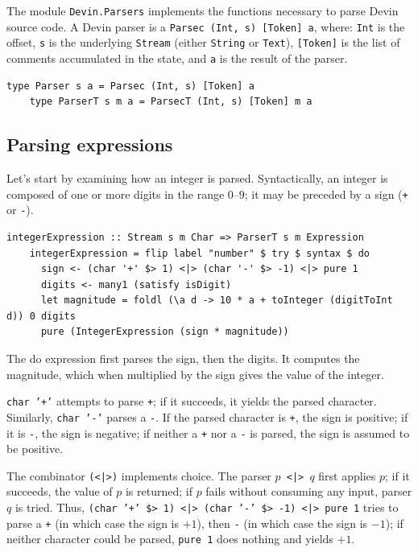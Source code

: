 \documentclass[UdineBachThesis,american,11pt]{PhdThesis}
\begin{document}
  \pagebreak

  The module \mbox{\texttt{Devin.Parsers}} implements the functions necessary to
  parse Devin source code. A Devin parser is a
  \mbox{\texttt{Parsec (Int, s) [Token] a}}, where: \mbox{\texttt{Int}} is the
  offset, \texttt{s} is the underlying \mbox{\texttt{Stream}} (either
  \mbox{\texttt{String}} or \mbox{\texttt{Text}}), \mbox{\texttt{[Token]}} is
  the list of comments accumulated in the state, and \texttt{a} is the result of
  the parser.

  \begin{Verbatim}[gobble=4,fontsize=\small]
    type Parser s a = Parsec (Int, s) [Token] a
    type ParserT s m a = ParsecT (Int, s) [Token] m a
  \end{Verbatim}

  \subsection{Parsing expressions}

  Let's start by examining how an integer is parsed. Syntactically, an integer
  is composed of one or more digits in the range \mbox{$0$--$9$}; it may be
  preceded by a sign (\texttt{+} or \texttt{-}).

  \begin{Verbatim}[gobble=4,fontsize=\small]
    integerExpression :: Stream s m Char => ParserT s m Expression
    integerExpression = flip label "number" $ try $ syntax $ do
      sign <- (char '+' $> 1) <|> (char '-' $> -1) <|> pure 1
      digits <- many1 (satisfy isDigit)
      let magnitude = foldl (\a d -> 10 * a + toInteger (digitToInt d)) 0 digits
      pure (IntegerExpression (sign * magnitude))
  \end{Verbatim}

  The do expression first parses the sign, then the digits. It computes the
  magnitude, which when multiplied by the sign gives the value of the integer.

  \mbox{\texttt{char '+'}} attempts to parse \texttt{+}; if it succeeds, it
  yields the parsed character. Similarly, \mbox{\texttt{char '-'}} parses a
  \texttt{-}. If the parsed character is \texttt{+}, the sign is positive; if it
  is \texttt{-}, the sign is negative; if neither a \texttt{+} nor a \texttt{-}
  is parsed, the sign is assumed to be positive.

  The combinator \mbox{\texttt{(<|>)}} implements choice. The parser
  \mbox{\texttt{$p$ <|> $q$}} first applies $p$; if it succeeds, the value of
  $p$ is returned; if $p$ fails without consuming any input, parser $q$ is
  tried. Thus, \mbox{\texttt{(char '+' \$> 1) <|> (char '-' \$> -1) <|> pure 1}}
  tries to parse a \texttt{+} (in which case the sign is \mbox{$+1$}), then
  \texttt{-} (in which case the sign is \mbox{$-1$}); if neither character could
  be parsed, \mbox{\texttt{pure 1}} does nothing and yields \mbox{$+1$}.
\end{document}
